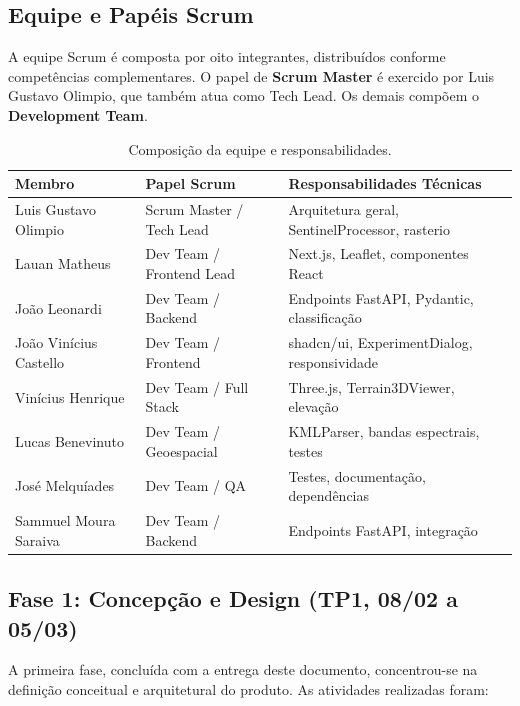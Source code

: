 \documentclass[12pt, a4paper]{article}
\begin{document}
\subsection{Equipe e Papéis Scrum}

A equipe Scrum é composta por oito integrantes, distribuídos conforme competências complementares. O papel de \textbf{Scrum Master} é exercido por Luis Gustavo Olimpio, que também atua como Tech Lead. Os demais compõem o \textbf{Development Team}.

\begin{table}[H]
\centering
\caption{Composição da equipe e responsabilidades.}
\label{tab:equipe}
\footnotesize
\begin{tabularx}{\textwidth}{p{4cm}lX}
\toprule
\textbf{Membro} & \textbf{Papel Scrum} & \textbf{Responsabilidades Técnicas} \\
\midrule
Luis Gustavo Olimpio & Scrum Master / Tech Lead & Arquitetura geral, SentinelProcessor, rasterio \\
Lauan Matheus & Dev Team / Frontend Lead & Next.js, Leaflet, componentes React \\
João Leonardi & Dev Team / Backend & Endpoints FastAPI, Pydantic, classificação \\
João Vinícius Castello & Dev Team / Frontend & shadcn/ui, ExperimentDialog, responsividade \\
Vinícius Henrique & Dev Team / Full Stack & Three.js, Terrain3DViewer, elevação \\
Lucas Benevinuto & Dev Team / Geoespacial & KMLParser, bandas espectrais, testes \\
José Melquíades & Dev Team / QA & Testes, documentação, dependências \\
Sammuel Moura Saraiva & Dev Team / Backend & Endpoints FastAPI, integração \\
\bottomrule
\end{tabularx}
\end{table}

\subsection{Fase 1: Concepção e Design (TP1, 08/02 a 05/03)}

A primeira fase, concluída com a entrega deste documento, concentrou-se na definição conceitual e arquitetural do produto. As atividades realizadas foram:
\end{document}
